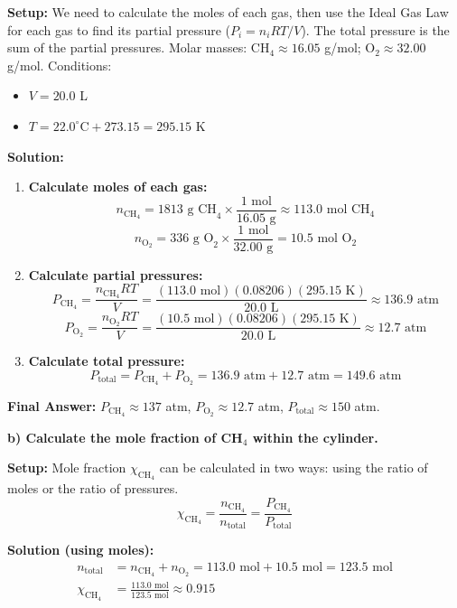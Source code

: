 \documentclass{article}
\begin{document}
\textbf{Setup:}
We need to calculate the moles of each gas, then use the Ideal Gas Law for each gas to find its partial pressure ($P_i = n_iRT/V$). The total pressure is the sum of the partial pressures.
Molar masses: CH$_4 \approx 16.05$ g/mol; O$_2 \approx 32.00$ g/mol.
Conditions:
\begin{itemize}
    \item $V = 20.0$ L
    \item $T = 22.0^{\circ}\text{C} + 273.15 = 295.15$ K
\end{itemize}

\textbf{Solution:}
\begin{enumerate}
    \item \textbf{Calculate moles of each gas:}
    \[ n_{\text{CH}_4} = 1813 \text{ g CH}_4 \times \frac{1 \text{ mol}}{16.05 \text{ g}} \approx 113.0 \text{ mol CH}_4 \]
    \[ n_{\text{O}_2} = 336 \text{ g O}_2 \times \frac{1 \text{ mol}}{32.00 \text{ g}} = 10.5 \text{ mol O}_2 \]
    \item \textbf{Calculate partial pressures:}
    \[ P_{\text{CH}_4} = \frac{n_{\text{CH}_4}RT}{V} = \frac{(113.0 \text{ mol})(0.08206)(295.15 \text{ K})}{20.0 \text{ L}} \approx 136.9 \text{ atm} \]
    \[ P_{\text{O}_2} = \frac{n_{\text{O}_2}RT}{V} = \frac{(10.5 \text{ mol})(0.08206)(295.15 \text{ K})}{20.0 \text{ L}} \approx 12.7 \text{ atm} \]
    \item \textbf{Calculate total pressure:}
    \[ P_{\text{total}} = P_{\text{CH}_4} + P_{\text{O}_2} = 136.9 \text{ atm} + 12.7 \text{ atm} = 149.6 \text{ atm} \]
\end{enumerate}

\textbf{Final Answer:} $P_{\text{CH}_4} \approx 137$ atm, $P_{\text{O}_2} \approx 12.7$ atm, $P_{\text{total}} \approx 150$ atm.

\textbf{b) Calculate the mole fraction of CH$_4$ within the cylinder.}

\textbf{Setup:}
Mole fraction $\chi_{\text{CH}_4}$ can be calculated in two ways: using the ratio of moles or the ratio of pressures.
\[ \chi_{\text{CH}_4} = \frac{n_{\text{CH}_4}}{n_{\text{total}}} = \frac{P_{\text{CH}_4}}{P_{\text{total}}} \]

\textbf{Solution (using moles):}
\begin{align*}
    n_{\text{total}} &= n_{\text{CH}_4} + n_{\text{O}_2} = 113.0 \text{ mol} + 10.5 \text{ mol} = 123.5 \text{ mol} \\
    \chi_{\text{CH}_4} &= \frac{113.0 \text{ mol}}{123.5 \text{ mol}} \approx 0.915
\end{align*}
\end{document}
